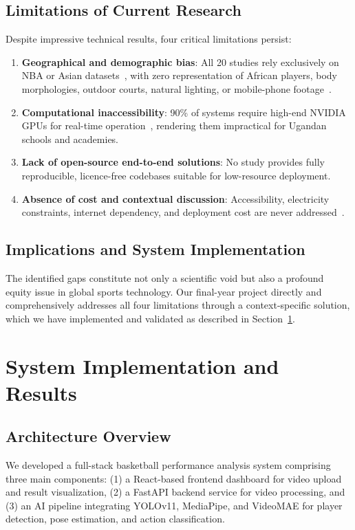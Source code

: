 \documentclass[conference]{IEEEtran}
\begin{document}
\subsection{Limitations of Current Research}
Despite impressive technical results, four critical limitations persist:
\begin{enumerate}
\item \textbf{Geographical and demographic bias}: All 20 studies rely exclusively on NBA or Asian datasets~\cite{li2023yolo,wang2024hoop,nguyen2021mlsport,su2022score}, with zero representation of African players, body morphologies, outdoor courts, natural lighting, or mobile-phone footage~\cite{ding2025thermal,li2025defensive,nagorna2025tactical}.
\item \textbf{Computational inaccessibility}: 90\% of systems require high-end NVIDIA GPUs for real-time operation~\cite{yan2024xgboost,wang2022explainable,stacked2025ensemble}, rendering them impractical for Ugandan schools and academies.
\item \textbf{Lack of open-source end-to-end solutions}: No study provides fully reproducible, licence-free codebases suitable for low-resource deployment.
\item \textbf{Absence of cost and contextual discussion}: Accessibility, electricity constraints, internet dependency, and deployment cost are never addressed~\cite{li2021shooting,song2022dribbling}.
\end{enumerate}

\subsection{Implications and System Implementation}
The identified gaps constitute not only a scientific void but also a profound equity issue in global sports technology. Our final-year project directly and comprehensively addresses all four limitations through a context-specific solution, which we have implemented and validated as described in Section~\ref{sec:implementation}.

\section{System Implementation and Results}
\label{sec:implementation}

\subsection{Architecture Overview}
We developed a full-stack basketball performance analysis system comprising three main components: (1) a React-based frontend dashboard for video upload and result visualization, (2) a FastAPI backend service for video processing, and (3) an AI pipeline integrating YOLOv11, MediaPipe, and VideoMAE for player detection, pose estimation, and action classification.
\end{document}
